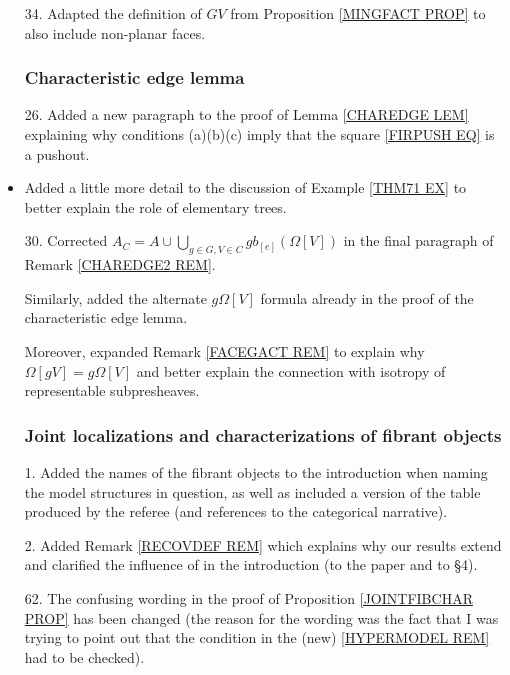 \documentclass{article}
\begin{document}
\begin{itemize}
\item[34.] Adapted the definition of $GV$ from Proposition \ref{MINGFACT PROP} to also include non-planar faces.
      



      \subsubsection*{Characteristic edge lemma}
\item[26.] Added a new paragraph to the proof of Lemma \ref{CHAREDGE LEM} explaining why conditions (a)(b)(c) imply that the square \eqref{FIRPUSH EQ} is a pushout. %

\item Added a little more detail to the discussion of Example \ref{THM71 EX} to better explain the role of elementary trees.

\item[30.] Corrected $A_C = 
      A \cup \bigcup_{g\in G,V \in C} g b_{[e]}(\Omega[V])$ in the final paragraph of Remark \ref{CHAREDGE2 REM}.
      
      Similarly, added the alternate $g \Omega[V]$ formula already in the proof of the characteristic edge lemma.
      
      Moreover, expanded Remark \ref{FACEGACT REM} to explain why $\Omega[gV] = g\Omega[V]$ and better explain the connection with isotropy of representable subpresheaves. %
      

      
      
      \subsubsection*{Joint localizations and characterizations of fibrant objects}
\item[1.] Added the names of the fibrant objects to the introduction when naming the model structures in question, as well as included a version of the table produced by the referee (and references to the categorical narrative).
      
\item[2.] Added Remark \ref{RECOVDEF REM} which explains why our results extend \cite[Thm. 6.6]{CM13a} and clarified the influence of \cite[Thm. 6.6]{CM13a} in the introduction (to the paper and to \S 4). %
      
\item[62.] The confusing wording in the proof of Proposition \ref{JOINTFIBCHAR PROP} has been changed (the reason for the wording was the fact that I was trying to point out that the condition in the (new) \ref{HYPERMODEL REM} had to be checked).
      

\end{itemize}
\end{document}
